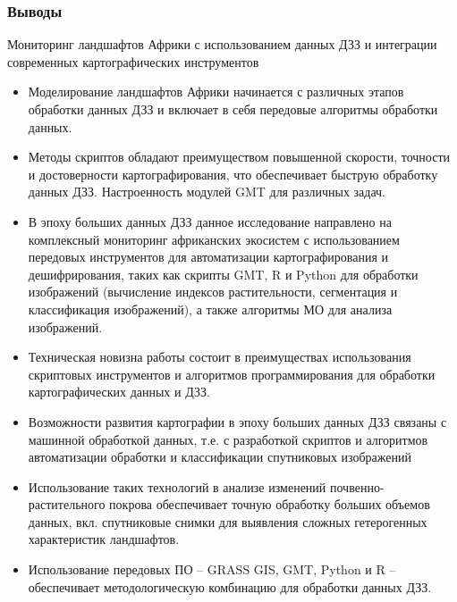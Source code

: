 \documentclass[pdflatex,compress,8pt,
	xcolor={dvipsnames,dvipsnames,svgnames,x11names,table},
	hyperref={colorlinks = true, breaklinks = true, urlcolor = NavyBlue, linkcolor=white, breaklinks = true}]{beamer}
\begin{document}
\begin{frame}\frametitle{Выводы}
\begin{alertblock}{Мониторинг ландшафтов Африки с использованием данных ДЗЗ и интеграции современных картографических инструментов}
\begin{itemize}\small
	\item Моделирование ландшафтов Африки начинается с различных этапов обработки данных ДЗЗ и включает в себя передовые алгоритмы обработки данных.
	\item Методы скриптов обладают преимуществом повышенной скорости, точности и достоверности картографирования, что обеспечивает быструю обработку данных ДЗЗ. Настроенность модулей GMT для различных задач.
	\item В эпоху больших данных ДЗЗ данное исследование направлено на комплексный мониторинг африканских экосистем с использованием передовых инструментов для автоматизации картографирования и дешифрирования, таких как скрипты GMT, R и Python для обработки изображений (вычисление индексов растительности, сегментация и классификация изображений), а также алгоритмы МО для анализа изображений.
	\item Техническая новизна работы состоит в преимуществах использования скриптовых инструментов и алгоритмов программирования для обработки картографических данных и ДЗЗ.
	\item Возможности развития картографии в эпоху больших данных ДЗЗ связаны с машинной обработкой данных, т.е. с разработкой скриптов и алгоритмов автоматизации обработки и классификации спутниковых изображений
	\item Использование таких технологий в анализе изменений почвенно-растительного покрова обеспечивает точную обработку больших объемов данных, вкл. спутниковые снимки для выявления сложных гетерогенных характеристик ландшафтов.
	\item Использование передовых ПО -- GRASS GIS, GMT, Python и R -- обеспечивает методологическую комбинацию для обработки данных ДЗЗ.
\end{itemize}
 \end{alertblock}
\end{frame}

\end{document}
